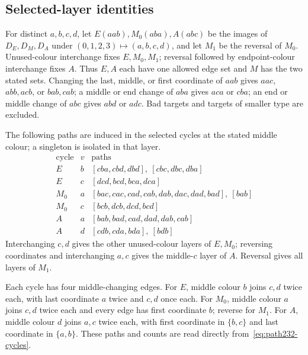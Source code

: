 \subsection{Selected-layer identities}
For distinct $a,b,c,d$, let $E(aab),M_0(aba),A(abc)$ be the images of
$D_E,D_M,D_A$ under $(0,1,2,3)\mapsto(a,b,c,d)$, and let $M_1$ be
the reversal of $M_0$. Unused-colour interchange fixes $E,M_0,M_1$;
reversal followed by endpoint-colour interchange fixes $A$. Thus
$E,A$ each have one allowed edge set and $M$ has the two stated sets.
Changing the last, middle, or first coordinate of $aab$ gives
$aac$, $abb,acb$, or $bab,cab$; a middle or end change of $aba$
gives $aca$ or $cba$; an end or middle change of $abc$ gives $abd$
or $adc$. Bad targets and targets of smaller type are excluded.

The following paths are induced in the selected cycles at the stated
middle colour; a singleton is isolated in that layer.
\[
\begin{array}{c|c|l}
\text{cycle}&v&\text{paths}\\\hline
E&b&[cba,cbd,dbd],\ [cbc,dbc,dba]\\
E&c&[dcd,bcd,bca,dca]\\
M_0&a&[bac,cac,cad,cab,dab,dac,dad,bad],\ [bab]\\
M_0&c&[bcb,dcb,dcd,bcd]\\
A&a&[bab,bad,cad,dad,dab,cab]\\
A&d&[cdb,cda,bda],\ [bdb]
\end{array}
\]
Interchanging $c,d$ gives the other unused-colour layers of $E,M_0$;
reversing coordinates and interchanging $a,c$ gives the middle-$c$
layer of $A$. Reversal gives all layers of $M_1$.

Each cycle has four middle-changing edges. For $E$, middle colour $b$
joins $c,d$ twice each, with last coordinate $a$ twice and $c,d$
once each. For $M_0$, middle colour $a$ joins $c,d$ twice each and
every edge has first coordinate $b$; reverse for $M_1$. For $A$,
middle colour $d$ joins $a,c$ twice each, with first coordinate in
$\{b,c\}$ and last coordinate in $\{a,b\}$. These paths and counts
are read directly from~\eqref{eq:path232-cycles}.
